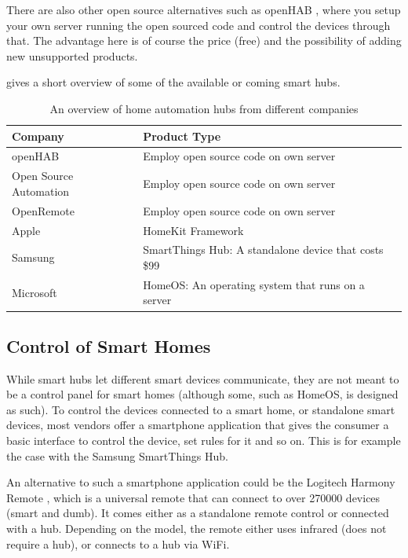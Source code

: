 There are also other open source alternatives such as openHAB \cite{OPENHAB}, 
where you setup your own server running the open sourced code and control the devices through that. 
The advantage here is of course the price (free) and the possibility of adding new unsupported products. 

 gives a short overview of some of the available or coming smart hubs. 
\begin{table}
    \centering
    \begin{tabular}{l l}
        Company                           & Product Type \\ \hline
        openHAB \cite{OPENHAB}             & Employ open source code on own server \\
        Open Source Automation \cite{OSA}  & Employ open source code on own server \\
        OpenRemote \cite{OPENREMOTE}       & Employ open source code on own server \\
        Apple \cite{HOMEKIT}               & HomeKit Framework \\
        Samsung \cite{SMARTTHINGS}         & SmartThings Hub: A standalone device that costs \$99 \\
        Microsoft \cite{HOMEOS}            & HomeOS: An operating system that runs on a server
    \end{tabular}
    \caption{An overview of home automation hubs from different companies}
    \label{table:smarthubs}
\end{table}

\subsection{Control of Smart Homes}\label{sec:smarthomecontrol}
While smart hubs let different smart devices communicate, 
they are not meant to be a control panel for smart homes (although some, such as HomeOS, is designed as such).
To control the devices connected to a smart home, or standalone smart devices, 
most vendors offer a smartphone application that gives the consumer a basic interface to control the device, 
set rules for it and so on.
This is for example the case with the Samsung SmartThings Hub. 

An alternative to such a smartphone application could be the Logitech Harmony Remote \cite{HARMONYREMOTE}, 
which is a universal remote that can connect to over \num{270000} devices (smart and dumb). 
It comes either as a standalone remote control or connected with a hub. 
Depending on the model, the remote either uses infrared (does not require a hub), 
or connects to a hub via WiFi. 

